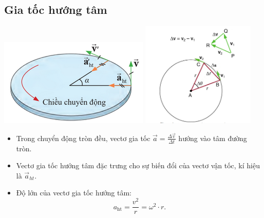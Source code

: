 \subsection{Gia tốc hướng tâm}
\begin{center}
	\includegraphics[scale=1]{../figs/G10-027-1}
	\includegraphics[height=5cm]{../figs/G10-027-1b}
\end{center}

\begin{itemize}
	\item Trong chuyển động tròn đều, vectơ gia tốc $\vec{a}=\frac{\Delta\vec{v}}{\Delta t}$  hướng vào  tâm đường tròn.
	\item Vectơ gia tốc hướng tâm đặc trưng cho sự biến đổi của vectơ vận tốc, kí hiệu là $\vec{a}_{ht}$.
	\item Độ lớn của vectơ gia tốc hướng tâm:
	\begin{equation*}
		a_\text{ht}=\frac{v^2}{r}=\omega^2 \cdot r.
	\end{equation*}
\end{itemize}
